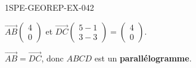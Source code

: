 \begin{corrige}{1SPE-GEOREP-EX-042}

$\vec{AB}\begin{pmatrix} 4 \\ 0 \end{pmatrix}$ et $\vec{DC}\begin{pmatrix} 5-1 \\ 3-3 \end{pmatrix} = \begin{pmatrix} 4 \\ 0 \end{pmatrix}$.

$\vec{AB} = \vec{DC}$, donc $ABCD$ est un \textbf{parallélogramme}.

\end{corrige}

